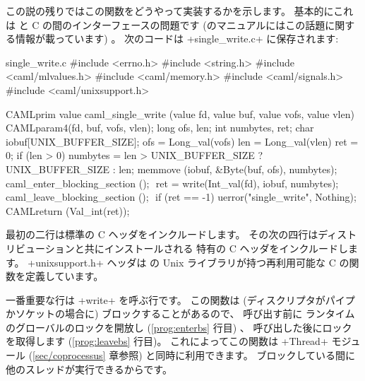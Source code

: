 この説の残りではこの関数をどうやって実装するかを示します。
基本的にこれは \ocaml と C の間のインターフェースの問題です (\ocaml のマニュアルにはこの話題に関する情報が載っています) 。
次のコードは \ml+single_write.c+ に保存されます:
%
\begin{listingcodefile}[style=numbers]{single_write.c}
#include <errno.h>
#include <string.h>
#include <caml/mlvalues.h>
#include <caml/memory.h>
#include <caml/signals.h>
#include <caml/unixsupport.h>

CAMLprim value caml_single_write
        (value fd, value buf, value vofs, value vlen) {
  CAMLparam4(fd, buf, vofs, vlen);
  long ofs, len;
  int numbytes, ret;
  char iobuf[UNIX_BUFFER_SIZE];
  ofs = Long_val(vofs)
  len = Long_val(vlen)
  ret = 0;
  if (len > 0) {
    numbytes = len > UNIX_BUFFER_SIZE ? UNIX_BUFFER_SIZE : len;
    memmove (iobuf, &Byte(buf, ofs), numbytes);
    caml_enter_blocking_section (); $\label{prog:enterbs}$
    ret = write(Int_val(fd), iobuf, numbytes);
    caml_leave_blocking_section (); $\label{prog:leavebs}$
    if (ret == -1) uerror("single_write", Nothing);
  }
  CAMLreturn (Val_int(ret));
}
\end{listingcodefile}
%
最初の二行は標準の C ヘッダをインクルードします。
その次の四行はディストリビューションと共にインストールされる \ocaml 特有の C ヘッダをインクルードします。
\ml+unixsupport.h+ ヘッダは \ocaml の Unix ライブラリが持つ再利用可能な C の関数を定義しています。

一番重要な行は \ml+write+ を呼ぶ行です。
この関数は (ディスクリプタがパイプかソケットの場合に) ブロックすることがあるので、
呼び出す前に \ocaml ランタイムのグローバルのロックを開放し (\ref{prog:enterbs} 行目) 、
呼び出した後にロックを取得します (\ref{prog:leavebs} 行目)。
これによってこの関数は \ml+Thread+ モジュール (\ref{sec/coprocessus} 章参照) と同時に利用できます。
ブロックしている間に他のスレッドが実行できるからです。

